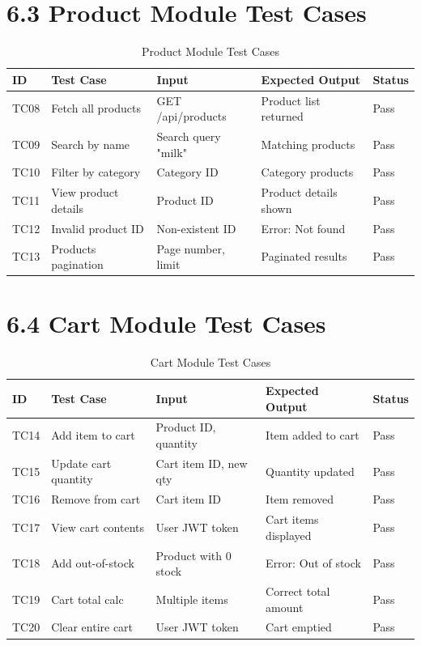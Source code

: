 \documentclass[12pt,a4paper]{report}
\begin{document}
\section*{6.3 Product Module Test Cases}

\begin{table}[H]
\centering
\small
\begin{tabular}{|p{0.8cm}|p{2.8cm}|p{3.8cm}|p{3cm}|p{1.2cm}|}
\hline
\textbf{ID} & \textbf{Test Case} & \textbf{Input} & \textbf{Expected Output} & \textbf{Status} \\
\hline
TC08 & Fetch all products & GET /api/products & Product list returned & Pass \\
\hline
TC09 & Search by name & Search query "milk" & Matching products & Pass \\
\hline
TC10 & Filter by category & Category ID & Category products & Pass \\
\hline
TC11 & View product details & Product ID & Product details shown & Pass \\
\hline
TC12 & Invalid product ID & Non-existent ID & Error: Not found & Pass \\
\hline
TC13 & Products pagination & Page number, limit & Paginated results & Pass \\
\hline
\end{tabular}
\caption{Product Module Test Cases}
\end{table}

\section*{6.4 Cart Module Test Cases}

\begin{table}[H]
\centering
\small
\begin{tabular}{|p{0.8cm}|p{2.8cm}|p{3.8cm}|p{3cm}|p{1.2cm}|}
\hline
\textbf{ID} & \textbf{Test Case} & \textbf{Input} & \textbf{Expected Output} & \textbf{Status} \\
\hline
TC14 & Add item to cart & Product ID, quantity & Item added to cart & Pass \\
\hline
TC15 & Update cart quantity & Cart item ID, new qty & Quantity updated & Pass \\
\hline
TC16 & Remove from cart & Cart item ID & Item removed & Pass \\
\hline
TC17 & View cart contents & User JWT token & Cart items displayed & Pass \\
\hline
TC18 & Add out-of-stock & Product with 0 stock & Error: Out of stock & Pass \\
\hline
TC19 & Cart total calc & Multiple items & Correct total amount & Pass \\
\hline
TC20 & Clear entire cart & User JWT token & Cart emptied & Pass \\
\hline
\end{tabular}
\caption{Cart Module Test Cases}
\end{table}
\end{document}
